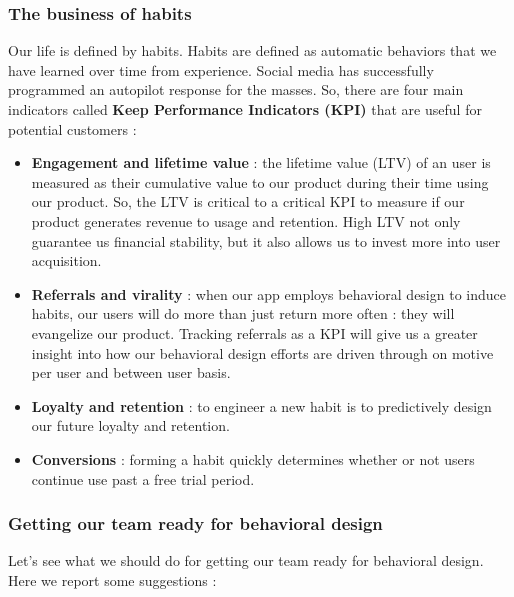 \documentclass[11pt]{article}
\begin{document}
\subsubsection{The business of habits}
Our life is defined by habits. Habits are defined as automatic behaviors that we have learned over time from experience. Social media has successfully programmed an autopilot response for the masses. So, there are four main indicators called \textbf{Keep Performance Indicators (KPI)} that are useful for potential customers :

\begin{itemize}
\item \textbf{Engagement and lifetime value} : the lifetime value (LTV) of an user is measured as their cumulative value to our product during their time using our product. So, the LTV is critical to a critical KPI to measure if our product generates revenue to usage and retention. High LTV not only guarantee us financial stability, but it also allows us to invest more into user acquisition.

\item \textbf{Referrals and virality} : when our app employs behavioral design to induce habits, our users will do more than just return more often : they will evangelize our product. Tracking referrals as a KPI will give us a greater insight into how our behavioral design efforts are driven through on motive per user and between user basis.

\item \textbf{Loyalty and retention} : to engineer a new habit is to predictively design our future loyalty and retention. 

\item \textbf{Conversions} : forming a habit quickly determines whether or not users continue use past a free trial period.
\end{itemize}

\subsubsection{Getting our team ready for behavioral design}
Let's see what we should do for getting our team ready for behavioral design. Here we report some suggestions :
\end{document}
